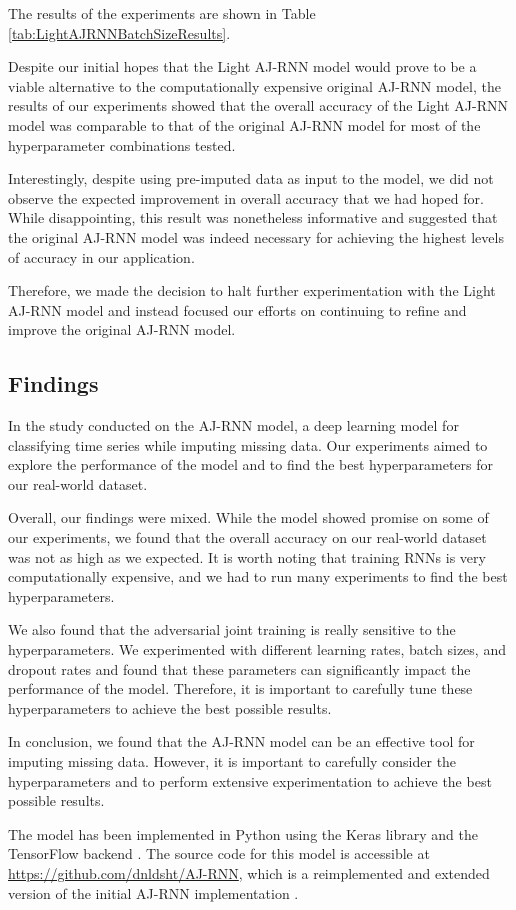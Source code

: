 The results of the experiments are shown in Table \ref{tab:LightAJRNNBatchSizeResults}.

Despite our initial hopes that the Light AJ-RNN model would prove to be a viable alternative to the computationally expensive original AJ-RNN model, the results of our experiments showed that the overall accuracy of the Light AJ-RNN model was comparable to that of the original AJ-RNN model for most of the hyperparameter combinations tested.

Interestingly, despite using pre-imputed data as input to the model, we did not observe the expected improvement in overall accuracy that we had hoped for. 
While disappointing, this result was nonetheless informative and suggested that the original AJ-RNN model was indeed necessary for achieving the highest levels of accuracy in our application.

Therefore, we made the decision to halt further experimentation with the Light AJ-RNN model and instead focused our efforts on continuing to refine and improve the original AJ-RNN model. 


\subsection{Findings}

In the study conducted on the AJ-RNN model, a deep learning model for classifying time series while imputing missing data.
Our experiments aimed to explore the performance of the model and to find the best hyperparameters for our real-world dataset.

Overall, our findings were mixed. 
While the model showed promise on some of our experiments, we found that the overall accuracy on our real-world dataset was not as high as we expected.
It is worth noting that training RNNs is very computationally expensive, and we had to run many experiments to find the best hyperparameters.

We also found that the adversarial joint training is really sensitive to the hyperparameters.
We experimented with different learning rates, batch sizes, and dropout rates and found that these parameters can significantly impact the performance of the model.
Therefore, it is important to carefully tune these hyperparameters to achieve the best possible results.

In conclusion, we found that the AJ-RNN model can be an effective tool for imputing missing data. 
However, it is important to carefully consider the hyperparameters and to perform extensive experimentation to achieve the best possible results.

The model has been implemented in Python using the Keras library \cite{chollet2015keras} and the TensorFlow backend \cite{tensorflow2015-whitepaper}.
The source code for this model is accessible at \url{https://github.com/dnldsht/AJ-RNN}, which is a reimplemented and extended version of the initial AJ-RNN implementation \cite{ajrnn}.